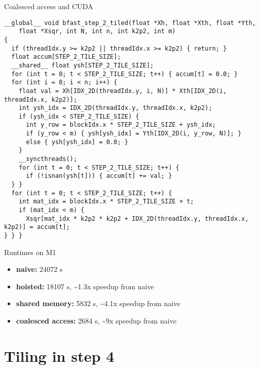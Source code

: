 \begin{frame}[fragile]{Coalesced access and CUDA}
\begin{verbatim}
__global__ void bfast_step_2_tiled(float *Xh, float *Xth, float *Yth,
    float *Xsqr, int N, int n, int k2p2, int m)
{
  if (threadIdx.y >= k2p2 || threadIdx.x >= k2p2) { return; }
  float accum[STEP_2_TILE_SIZE];
  __shared__ float ysh[STEP_2_TILE_SIZE];
  for (int t = 0; t < STEP_2_TILE_SIZE; t++) { accum[t] = 0.0; }
  for (int i = 0; i < n; i++) {
    float val = Xh[IDX_2D(threadIdx.y, i, N)] * Xth[IDX_2D(i, threadIdx.x, k2p2)];
    int ysh_idx = IDX_2D(threadIdx.y, threadIdx.x, k2p2);
    if (ysh_idx < STEP_2_TILE_SIZE) {
      int y_row = blockIdx.x * STEP_2_TILE_SIZE + ysh_idx;
      if (y_row < m) { ysh[ysh_idx] = Yth[IDX_2D(i, y_row, N)]; }
      else { ysh[ysh_idx] = 0.0; }
    }
    __syncthreads();
    for (int t = 0; t < STEP_2_TILE_SIZE; t++) {
      if (!isnan(ysh[t])) { accum[t] += val; }
  } }
  for (int t = 0; t < STEP_2_TILE_SIZE; t++) {
    int mat_idx = blockIdx.x * STEP_2_TILE_SIZE + t;
    if (mat_idx < m) {
      Xsqr[mat_idx * k2p2 * k2p2 + IDX_2D(threadIdx.y, threadIdx.x, k2p2)] = accum[t];
} } }
\end{verbatim}
\end{frame}

\begin{frame}[fragile]{Runtimes on M1}
\begin{itemize}
  \item  \textbf{naive:} 24072 \textmu s
  \item  \textbf{hoisted:} 18107 \textmu s, \textasciitilde 1.3x speedup from naive
  \item  \textbf{shared memory:} 5832 \textmu s, \textasciitilde 4.1x speedup from naive
  \item  \textbf{coalesced access:} 2684 \textmu s, \textasciitilde 9x speedup from naive
\end{itemize}
\end{frame}

\section{Tiling in step 4}


